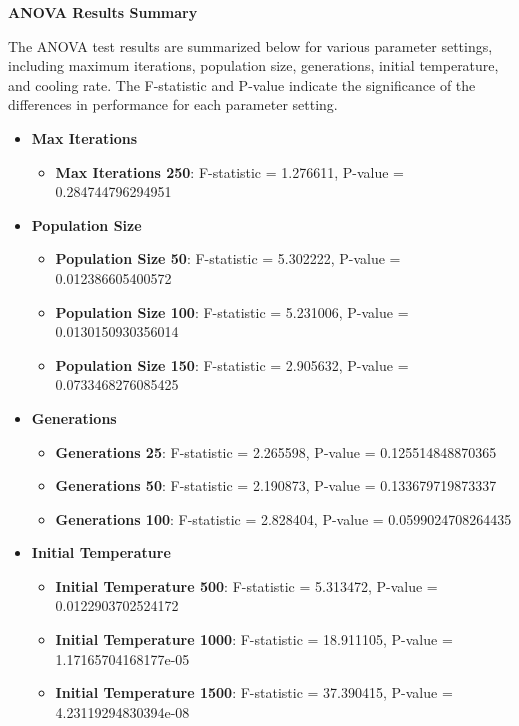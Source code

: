 \documentclass{article}
\begin{document}
    \textbf{ANOVA Results Summary}

    The ANOVA test results are summarized below for various parameter settings, including maximum iterations, population size, generations, initial temperature, and cooling rate. The F-statistic and P-value indicate the significance of the differences in performance for each parameter setting.

    \begin{itemize}
        \item \textbf{Max Iterations}
        \begin{itemize}
            \item \textbf{Max Iterations 250}: F-statistic = 1.276611, P-value = 0.284744796294951
        \end{itemize}
        \item \textbf{Population Size}
        \begin{itemize}
            \item \textbf{Population Size 50}: F-statistic = 5.302222, P-value = 0.012386605400572
            \item \textbf{Population Size 100}: F-statistic = 5.231006, P-value = 0.0130150930356014
            \item \textbf{Population Size 150}: F-statistic = 2.905632, P-value = 0.0733468276085425
        \end{itemize}
        \item \textbf{Generations}
        \begin{itemize}
            \item \textbf{Generations 25}: F-statistic = 2.265598, P-value = 0.125514848870365
            \item \textbf{Generations 50}: F-statistic = 2.190873, P-value = 0.133679719873337
            \item \textbf{Generations 100}: F-statistic = 2.828404, P-value = 0.0599024708264435
        \end{itemize}
        \item \textbf{Initial Temperature}
        \begin{itemize}
            \item \textbf{Initial Temperature 500}: F-statistic = 5.313472, P-value = 0.0122903702524172
            \item \textbf{Initial Temperature 1000}: F-statistic = 18.911105, P-value = 1.17165704168177e-05
            \item \textbf{Initial Temperature 1500}: F-statistic = 37.390415, P-value = 4.23119294830394e-08
        \end{itemize}
    \end{itemize}
\end{document}
